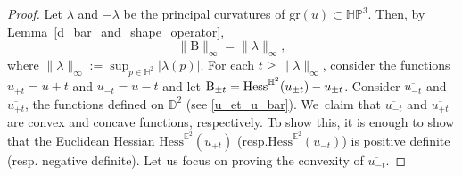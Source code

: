\documentclass[11pt]{article}
\makeatletter
\newcommand{\resp}{resp.\xspace}
\DeclareRobustCommand{\mathbbm}[1]{\csname jepbb@#1\endcsname}
\theoremstyle{plain}
\theoremstyle{definition}
\newcommand{\HP}{\mathbb{HP}^3}
\newcommand{\hess}{\mathrm{Hess}^{\mathbb{H}^2}}
\newcommand{\B}{\mathrm{B}}
\makeatother
\begin{document}
\begin{proof}
Let \(\lambda\) and \(-\lambda\) be the principal curvatures of \(\mathrm{gr}(u) \subset \HP\). Then, by Lem\-ma~\ref{d_bar_and_shape_operator},
\[
\lVert \B \rVert_{\infty} = \lVert \lambda \rVert_{\infty},
\]
where \(\lVert \lambda \rVert_{\infty} := \sup_{p \in \mathbb{H}^2} \lvert \lambda(p) \rvert.\)
For each \(t \geq \lVert \lambda \rVert_{\infty} \), consider the functions \(u_{{+t}} = u + t \) and \(u_{{-t}} = u - t \) and let \(\B_{\pm t} = \hess(u_{\pm t}) - u_{\pm t} \mathbbm{1} \). Consider \(\overline{u_{{-t}}} \) and \(\overline{u_{{+t}}} \), the functions defined on \(\mathbb{D}^2 \) (see \eqref{u_et_u_bar}). We~claim that \(\overline{u_{{-t}}} \) and \(\overline{u_{{+t}}} \) are convex and concave functions, respectively. To show this, it is enough to show that the Euclidean Hessian \(\mathrm{Hess}^{\mathbb{E}^2}(\overline{u_{{+t}}}) \) (\resp \(\mathrm{Hess}^{\mathbb{E}^2}(\overline{u_{{-t}}}) \)) is positive definite (\resp negative definite). Let us focus on proving the convexity of \(\overline{u_{{-t}}} \).


\end{proof}
\end{document}
